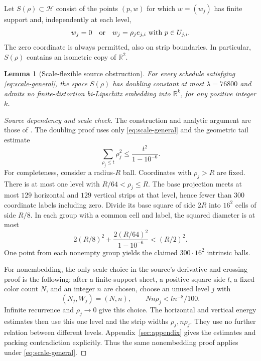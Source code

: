 \documentclass[
  11pt,
]{article}
\newtheorem{lemma}[theorem]{Lemma}
\theoremstyle{remark}\newtheorem{remark}[theorem]{Remark}
\newcommand{\R}{\mathbb R}\newcommand{\N}{\mathbb N}\newcommand{\Z}{\mathbb Z}
\begin{document}
Let $S(\rho)\subset\mathcal H$ consist of the points $(p,w)$ for which $w=(w_j)$ has finite support and, independently at each level,
\begin{equation}\label{eq:coordinate}
 w_j=0\quad\hbox{or}\quad w_j=\rho_j e_{j,i}\ \hbox{with }p\in U_{j,i}.
\end{equation}
The zero coordinate is always permitted, also on strip boundaries. In particular, $S(\rho)$ contains an isometric copy of $\R^2$.

\begin{lemma}[Scale-flexible source obstruction]\label{lem:source}
For every schedule satisfying \eqref{eq:scale-general}, the space $S(\rho)$ has doubling constant at most $\lambda=76800$ and admits no finite-distortion bi-Lipschitz embedding into $\R^k$, for any positive integer $k$.
\end{lemma}

\begin{proof}[Source dependency and scale check]
The construction and analytic argument are those of \cite[Sections 2--5]{OpenAI}. The doubling proof uses only \eqref{eq:scale-general} and the geometric tail estimate
\begin{equation}\label{eq:tail}
 \sum_{\rho_j\le t}\rho_j^2\le\frac{t^2}{1-10^{-6}}.
\end{equation}
For completeness, consider a radius-$R$ ball. Coordinates with $\rho_j>R$ are fixed. There is at most one level with $R/64<\rho_j\le R$. The base projection meets at most $129$ horizontal and $129$ vertical strips at that level, hence fewer than $300$ coordinate labels including zero. Divide its base square of side $2R$ into $16^2$ cells of side $R/8$. In each group with a common cell and label, the squared diameter is at most
\[
 2(R/8)^2+\frac{2(R/64)^2}{1-10^{-6}}<(R/2)^2.
\]
One point from each nonempty group yields the claimed $300\cdot16^2$ intrinsic balls.

For nonembedding, the only scale choice in the source's derivative and crossing proof is the following: after a finite-support sheet, a positive square side $l$, a fixed color count $N$, and an integer $n$ are chosen, choose an unused level $j$ with
\begin{equation}\label{eq:source-choice}
 (N_j,W_j)=(N,n),\qquad Nn\rho_j<l n^{-8}/100.
\end{equation}
Infinite recurrence and $\rho_j\to0$ give this choice. The horizontal and vertical energy estimates then use this one level and the strip widths $\rho_j,n\rho_j$. They use no further relation between different levels. Appendix~\ref{sec:appendix} gives the estimates and packing contradiction explicitly. Thus the same nonembedding proof applies under \eqref{eq:scale-general}.
\end{proof}
\end{document}
